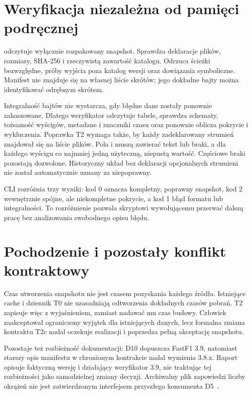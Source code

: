 \section{Weryfikacja niezależna od pamięci podręcznej}

 odczytuje wyłącznie rozpakowany snapshot.
Sprawdza deklaracje plików, rozmiary, SHA-256 i rzeczywistą zawartość
katalogu. Odrzuca ścieżki bezwzględne, próby wyjścia poza katalog wersji
oraz dowiązania symboliczne. Manifest nie znajduje się na własnej liście
skrótów; jego dokładne bajty można identyfikować odrębnym skrótem.

Integralność bajtów nie wystarcza, gdy błędne dane zostały ponownie
zahaszowane. Dlatego weryfikator odczytuje tabele, sprawdza schematy,
tożsamość wyścigów, metadane i znaczniki czasu oraz ponownie oblicza
pokrycie i wykluczenia. Poprawka T2 wymaga także, by każdy zadeklarowany
strumień znajdował się na liście plików. Pola  i
 muszą zawierać tekst lub braki, a dla każdego wyścigu
co najmniej jedną użyteczną, niepustą wartość. Częściowe braki pozostają
dozwolone. Historyczny układ bez deklaracji opcjonalnych strumieni nie
został automatycznie uznany za niepoprawny.

CLI rozróżnia trzy wyniki: kod 0 oznacza kompletny, poprawny snapshot,
kod 2 wewnętrznie spójne, ale niekompletne pokrycie, a kod 1 błąd formatu
lub integralności. To rozróżnienie pozwala skryptowi wywołującemu
przerwać dalszą pracę bez analizowania swobodnego opisu błędu.

\section{Pochodzenie i pozostały konflikt kontraktowy}

Czas utworzenia snapshotu nie jest czasem pozyskania każdego źródła.
Istniejące cache i dziennik T0 nie uzasadniają odtworzenia dokładnych
czasów pobrań. T2 zapisuje więc  z wyjaśnieniem,
zamiast nadawać mu czas budowy. Człowiek zaakceptował ograniczony wyjątek
dla istniejących danych, lecz formalna zmiana kontraktu T2c nadal
oczekuje realizacji i poprzedza pełną akceptację snapshotu.

Pozostaje też rozbieżność dokumentacji: D10 dopuszcza FastF1 3.9,
natomiast starszy opis manifestu w chronionym kontrakcie nadal wymienia
3.8.x. Raport opisuje faktyczną wersję i działający weryfikator 3.9,
nie traktując tej rozbieżności jako samodzielnej zmiany decyzji.
Archiwalny plik zapowiedzi liczby okrążeń nie jest zatwierdzonym
interfejsem przyszłego konsumenta D5~\cite{runbook,t2merge}.
